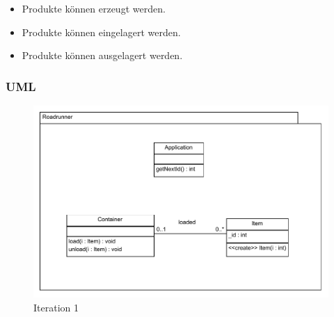 \begin{itemize}
  \item Produkte können erzeugt werden.
  \item Produkte können eingelagert werden.
  \item Produkte können ausgelagert werden.
\end{itemize}

\subsubsection{UML}

\begin{figure}
	\centering
		\includegraphics[width=\textwidth]{files/pdf/Iteration1.pdf}
	\caption{Iteration 1}
	\label{fig:Iteration1}
\end{figure}
